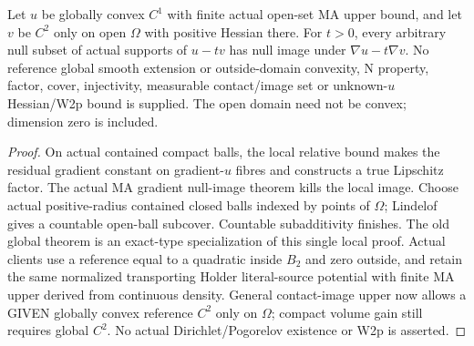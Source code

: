 \begin{lemma}
  \label{lem:convex-reference-contact-null-image}
  \leanok
  Let $u$ be globally convex $C^1$ with finite actual open-set MA upper bound,
  and let $v$ be $C^2$ only on open $\Omega$ with positive Hessian there.
  For $t>0$, every arbitrary null subset of actual supports of $u-tv$ has null
  image under $\nabla u-t\nabla v$. No reference global smooth extension or
  outside-domain convexity, N property, factor, cover, injectivity, measurable
  contact/image set or unknown-$u$ Hessian/W2p bound is supplied. The open domain
  need not be convex; dimension zero is included.
\end{lemma}
\begin{proof}
  \leanok
  On actual contained compact balls, the local relative bound makes the residual
  gradient constant on gradient-$u$ fibres and constructs a true Lipschitz factor.
  The actual MA gradient null-image theorem kills the local image. Choose actual
  positive-radius contained closed balls indexed by points of $\Omega$; Lindelof
  gives a countable open-ball subcover. Countable subadditivity finishes. The old
  global theorem is an exact-type specialization of this single local proof.
  Actual clients use a reference equal to a quadratic inside $B_2$ and zero
  outside, and retain the same normalized transporting Holder literal-source
  potential with finite MA upper derived from continuous density. General
  contact-image upper now allows a GIVEN globally convex reference $C^2$ only
  on $\Omega$; compact volume gain still requires global $C^2$. No actual Dirichlet/Pogorelov existence or W2p is asserted.
\end{proof}


